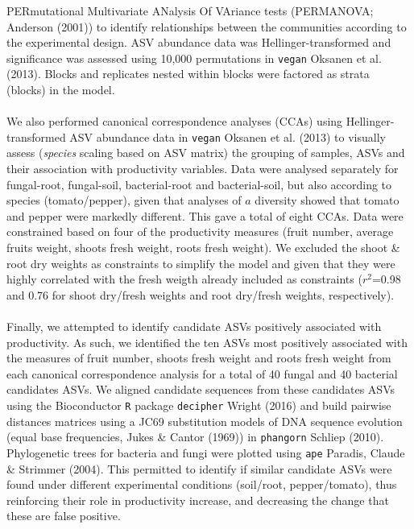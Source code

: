 \documentclass[11pt,]{article}
\begin{document}
PERmutational Multivariate ANalysis Of VAriance tests (PERMANOVA;
Anderson (2001)) to identify relationships between the communities
according to the experimental design. ASV abundance data was
Hellinger-transformed and significance was assessed using 10,000
permutations in \texttt{vegan} Oksanen et al. (2013). Blocks and
replicates nested within blocks were factored as strata (blocks) in the
model.\\
\hspace*{0.333em}\\
We also performed canonical correspondence analyses (CCAs) using
Hellinger-transformed ASV abundance data in \texttt{vegan} Oksanen et
al. (2013) to visually assess (\emph{species} scaling based on ASV
matrix) the grouping of samples, ASVs and their association with
productivity variables. Data were analysed separately for fungal-root,
fungal-soil, bacterial-root and bacterial-soil, but also according to
species (tomato/pepper), given that analyses of \(a\) diversity showed
that tomato and pepper were markedly different. This gave a total of
eight CCAs. Data were constrained based on four of the productivity
measures (fruit number, average fruits weight, shoots fresh weight,
roots fresh weight). We excluded the shoot \& root dry weights as
constraints to simplify the model and given that they were highly
correlated with the fresh weigth already included as constraints
(\(r^2\)=0.98 and 0.76 for shoot dry/fresh weights and root dry/fresh
weights, respectively). ~\\
\hspace*{0.333em}\\
Finally, we attempted to identify candidate ASVs positively associated
with productivity. As such, we identified the ten ASVs most positively
associated with the measures of fruit number, shoots fresh weight and
roots fresh weight from each canonical correspondence analysis for a
total of 40 fungal and 40 bacterial candidates ASVs. We aligned
candidate sequences from these candidates ASVs using the Bioconductor
\texttt{R} package \texttt{decipher} Wright (2016) and build pairwise
distances matrices using a JC69 substitution models of DNA sequence
evolution (equal base frequencies, Jukes \& Cantor (1969)) in
\texttt{phangorn} Schliep (2010). Phylogenetic trees for bacteria and
fungi were plotted using \texttt{ape} Paradis, Claude \& Strimmer
(2004). This permitted to identify if similar candidate ASVs were found
under different experimental conditions (soil/root, pepper/tomato), thus
reinforcing their role in productivity increase, and decreasing the
change that these are false positive.\\
\hspace*{0.333em} ~
\end{document}
